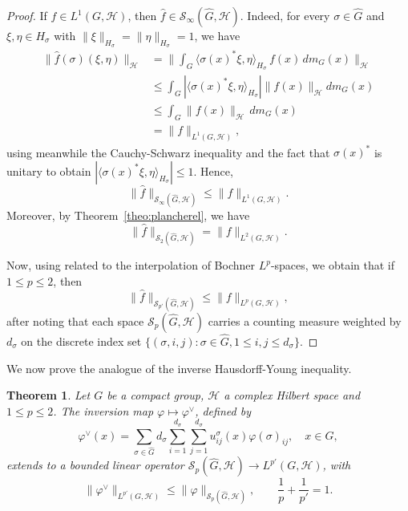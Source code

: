 \documentclass[10pt,a4paper]{amsart}
\newtheorem{theorem}{Theorem}[section]
\begin{document}
\begin{proof}
If $f\in L^1(G,\mathcal{H})$, then $\widehat{f}\in \mathscr{S}_\infty(\widehat{G},\mathcal{H})$. Indeed,
for every $\sigma\in\widehat{G}$ and $\xi,\eta\in H_\sigma$ with
$\|\xi\|_{H_\sigma}=\|\eta\|_{H_\sigma}=1$, we have
\begin{align*}
\|\hat f(\sigma)(\xi,\eta)\|_\mathcal{H}&=\Big\|\int_G\langle\sigma(x)^*\xi,\eta\rangle_{H_\sigma}\,
f(x)\,dm_G(x)\Big\|_\mathcal{H}\\
&\le \int_G|\langle\sigma(x)^*\xi,\eta\rangle_{H_\sigma}|
\|f(x)\|_\mathcal{H}dm_G(x)\\
&\le\int_G\|f(x)\|_\mathcal{H}\,dm_G(x)\\
&=\|f\|_{L^1(G,\mathcal{H})},
\end{align*}
using meanwhile the Cauchy-Schwarz inequality and the fact that  $\sigma(x)^*$ is unitary to obtain $|\langle\sigma(x)^*\xi,\eta\rangle_{H_\sigma}|\le1$.
Hence, 
\begin{equation}\label{OneInfinity}
\|\widehat f\|_{\mathscr{S}_\infty(\widehat{G},\mathcal{H})}\le\|f\|_{L^1(G,\mathcal{H})}. 
\end{equation}
Moreover, by Theorem~\ref{theo:plancherel}, we have 
\begin{equation}
\|\widehat f\|_{\mathscr{S}_2(\widehat{G},\mathcal{H})}=\|f\|_{L^2(G,\mathcal{H})}. 
\end{equation}

Now, using  \cite[Theorem 5.1.2]{BerghLofstrom} related to the  interpolation of  Bochner $L^p$-spaces,  we obtain  that if $1\leq p\leq 2$, then  
$$
\|\widehat f\|_{\mathscr{S}_{p'}(\widehat{G},\mathcal{H})}\le\|f\|_{L^p(G,\mathcal{H})},
$$
after noting that  each  space  $\mathscr{S}_p(\widehat{G},\mathcal{H})$ carries a  counting measure 
weighted by $d_\sigma$ on the discrete index set $\{(\sigma,i,j):\sigma\in \widehat{G}, 1\le i,j\le d_\sigma\}$. 
\end{proof}


We now prove the analogue of the inverse Hausdorff-Young inequality.
\begin{theorem}\label{theo:invHY}
Let $G$ be a compact group,  $\mathcal{H}$  a complex Hilbert space  and $1\le p\le2$. The inversion map $\varphi\mapsto\varphi^\vee$, defined by
\begin{equation}
\varphi^\vee(x)=\sum_{\sigma\in\widehat{G}}d_\sigma\sum_{i=1}^{d_\sigma}\sum_{j=1}^{d_\sigma}u^\sigma_{ij}(x)\varphi(\sigma)_{ij},\quad x\in G,
\end{equation}
extends to a bounded linear operator $\mathscr{S}_p(\widehat{G},\mathcal{H})\to L^{p'}(G,\mathcal{H})$, with
\[
\|\varphi^\vee\|_{L^{p'}(G,\mathcal{H})}\le\|\varphi\|_{\mathscr{S}_p(\widehat{G},\mathcal{H})},\qquad
\frac1p+\frac1{p'}=1.
\]
\end{theorem}
\end{document}

